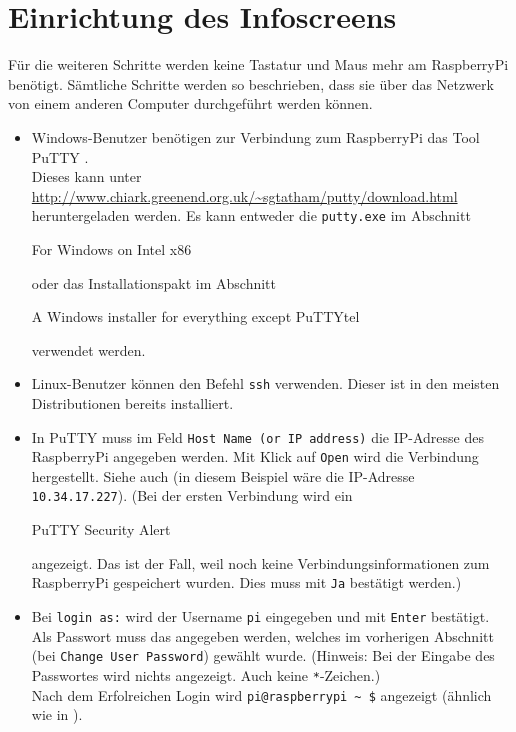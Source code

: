 \clearpage

\section{Einrichtung des Infoscreens}
\label{sec:stepssetup}
Für die weiteren Schritte werden keine Tastatur und Maus mehr am RaspberryPi benötigt. 
Sämtliche Schritte werden so beschrieben, dass sie über das Netzwerk von einem anderen Computer durchgeführt werden können.

\begin{itemize}
	\item {Windows-Benutzer benötigen zur Verbindung zum RaspberryPi das Tool PuTTY \cite{putty}.\\
		Dieses kann unter \url{http://www.chiark.greenend.org.uk/\~sgtatham/putty/download.html} heruntergeladen werden. 
		Es kann entweder die \lstinline|putty.exe| im Abschnitt \begin{em}For Windows on Intel x86\end{em} oder das Installationspakt im Abschnitt \begin{em}A Windows installer for everything except PuTTYtel\end{em} verwendet werden.
		}
	\item {Linux-Benutzer können den Befehl \lstinline|ssh| verwenden. Dieser ist in den meisten Distributionen bereits installiert.
		}
	\item {In PuTTY muss im Feld \lstinline|Host Name (or IP address)| die IP-Adresse des RaspberryPi angegeben werden. Mit Klick auf \lstinline|Open| wird die Verbindung hergestellt.
		Siehe auch  (in diesem Beispiel wäre die IP-Adresse \lstinline|10.34.17.227|).
		(Bei der ersten Verbindung wird ein \begin{em}PuTTY Security Alert\end{em} angezeigt. 
		Das ist der Fall, weil noch keine Verbindungsinformationen zum RaspberryPi gespeichert wurden. Dies muss mit \lstinline|Ja| bestätigt werden.)
		}
	\item {Bei \lstinline|login as:| wird der Username \lstinline|pi| eingegeben und mit \lstinline|Enter| bestätigt.
		Als Passwort muss das angegeben werden, welches im vorherigen Abschnitt (bei \lstinline|Change User Password|) gewählt wurde.
		(Hinweis: Bei der Eingabe des Passwortes wird nichts angezeigt. Auch keine \lstinline|*|-Zeichen.)\\
		Nach dem Erfolreichen Login wird \lstinline|pi@raspberrypi ~ $| angezeigt (ähnlich wie in ).
}
\end{itemize}
